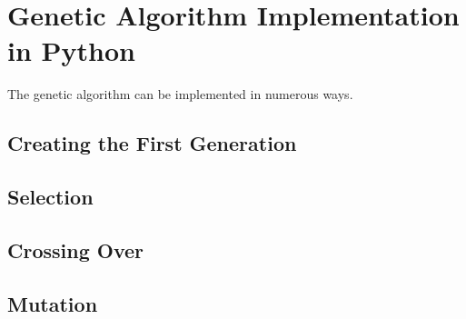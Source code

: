 \section{Genetic Algorithm Implementation in Python}

The genetic algorithm can be implemented in numerous ways. 

\subsection{Creating the First Generation}

\subsection{Selection}


\subsection{Crossing Over}

\subsection{Mutation}
